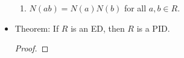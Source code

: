 \documentclass[../notes.tex]{subfiles}
\begin{document}
\begin{itemize}
    \begin{enumerate}[label={(\roman*)},start=3]
        \item $N(ab)=N(a)N(b)$ for all $a,b\in R$.
    \end{enumerate}
    \item Theorem: If $R$ is an ED, then $R$ is a PID.
    \begin{proof}



\end{proof}
\end{itemize}
\end{document}
